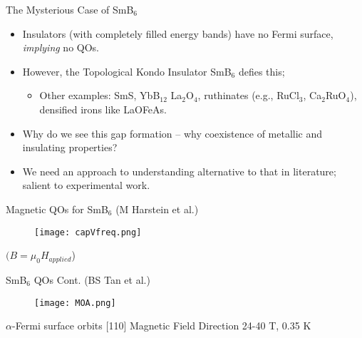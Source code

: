 \documentclass{beamer}
\begin{document}


\begin{frame}{The Mysterious Case of SmB$_6$}
    \begin{itemize}
        \item Insulators (with completely filled energy bands) have no Fermi surface, \textit{implying} no QOs.
        
        \item However, the Topological Kondo Insulator SmB$_6$ defies this;
            \begin{itemize}
                \item Other examples: SmS, YbB$_{12}$ La$_2$O$_4$, ruthinates (e.g., RuCl$_3$, Ca$_2$RuO$_4$), densified irons like LaOFeAs.
            \end{itemize}

        \item Why do we see this gap formation -- why coexistence of metallic and insulating properties?
        
        
        
        \item We need an approach to understanding alternative to that in literature; salient to experimental work. 
    \end{itemize}
\end{frame}




\begin{frame}{Magnetic QOs for SmB$_6$ (M Harstein et al.) }

    \begin{figure}
    \centering
    \texttt{[image: capVfreq.png]}
    \label{fig:elecmuon}
    \end{figure}
    
    \centering $(B=\mu_0 H_{applied}$)

\end{frame}




\begin{frame}{SmB$_6$ QOs Cont. (BS Tan et al.)}

    \begin{figure}
    \centering
    \texttt{[image: MOA.png]}
    \label{fig:elecmuon}
    \end{figure}
    
    $\alpha$-Fermi surface orbits 
    [110] Magnetic Field Direction
    24-40 T, 0.35 K

\end{frame}
\end{document}
